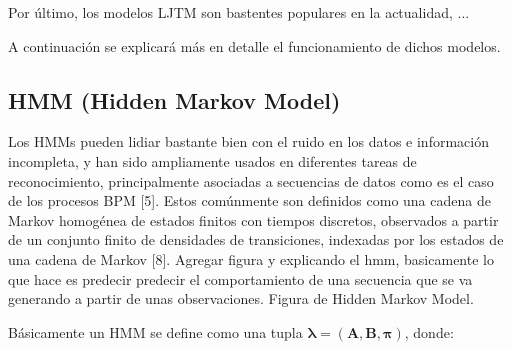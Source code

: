 Por último, los modelos LJTM son bastentes populares en la actualidad, ...

A continuación se explicará más en detalle el funcionamiento de dichos modelos.

\subsection{HMM (Hidden Markov Model) }

Los HMMs pueden lidiar bastante bien con el ruido en los datos e información incompleta, y han sido ampliamente usados en diferentes tareas de reconocimiento, principalmente asociadas a secuencias de datos como es el caso de los procesos BPM [5]. Estos comúnmente son  definidos como una cadena de Markov homogénea de estados finitos con tiempos discretos, observados a partir de un conjunto finito de densidades de transiciones, indexadas por los estados de una cadena de Markov [8]. Agregar figura y explicando el hmm, basicamente lo que hace es predecir predecir el comportamiento de una secuencia que se va generando a partir de unas observaciones.
Figura de Hidden Markov Model.


Básicamente un HMM se define como una tupla $\boldsymbol\lambda = ( \textbf{A} , \textbf{B} , \boldsymbol\pi )$, donde:

